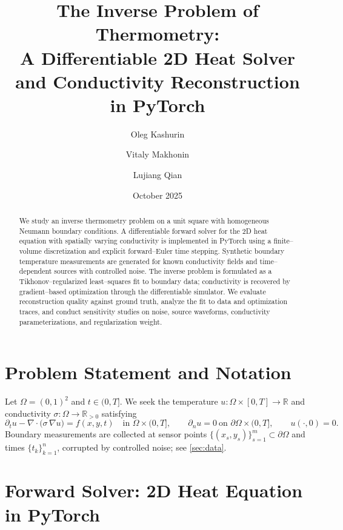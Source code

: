 \documentclass[11pt,a4paper]{article}
\title{\vspace{-1em}\textbf{The Inverse Problem of Thermometry:}\\
A Differentiable 2D Heat Solver and Conductivity Reconstruction in PyTorch}
\author{Oleg Kashurin \and Vitaly Makhonin \and Lujiang Qian}
\date{October 2025}
\numberwithin{equation}{section}
\newcommand{\R}{\mathbb{R}}
\newcommand{\grad}{\nabla}
\newcommand{\divg}{\nabla\!\cdot}
\begin{document}
\maketitle

\begin{abstract}
We study an inverse thermometry problem on a unit square with homogeneous Neumann boundary conditions. 
A differentiable forward solver for the 2D heat equation with spatially varying conductivity is implemented in PyTorch using a finite--volume discretization and explicit forward--Euler time stepping.
Synthetic boundary temperature measurements are generated for known conductivity fields and time--dependent sources with controlled noise.
The inverse problem is formulated as a Tikhonov--regularized least--squares fit to boundary data; conductivity is recovered by gradient--based optimization through the differentiable simulator.
We evaluate reconstruction quality against ground truth, analyze the fit to data and optimization traces, and conduct sensitivity studies on noise, source waveforms, conductivity parameterizations, and regularization weight.
\end{abstract}

\section{Problem Statement and Notation}
Let $\Omega=(0,1)^2$ and $t\in(0,T]$. We seek the temperature $u:\Omega\times[0,T]\to\R$ and conductivity $\sigma:\Omega\to\R_{>0}$ satisfying
\begin{equation}
  \partial_t u - \divg\!\big(\sigma\, \grad u\big) = f(x,y,t)\quad \text{in }\Omega\times(0,T], 
  \qquad \partial_n u = 0 \ \text{on }\partial\Omega\times(0,T], 
  \qquad u(\cdot,0) = 0.
  \label{eq:pde}
\end{equation}
Boundary measurements are collected at sensor points $\{(x_s,y_s)\}_{s=1}^m\subset\partial\Omega$ and times $\{t_k\}_{k=1}^n$, corrupted by controlled noise; see \cref{sec:data}.

\section{Forward Solver: 2D Heat Equation in PyTorch}
\label{sec:forward}
\end{document}
